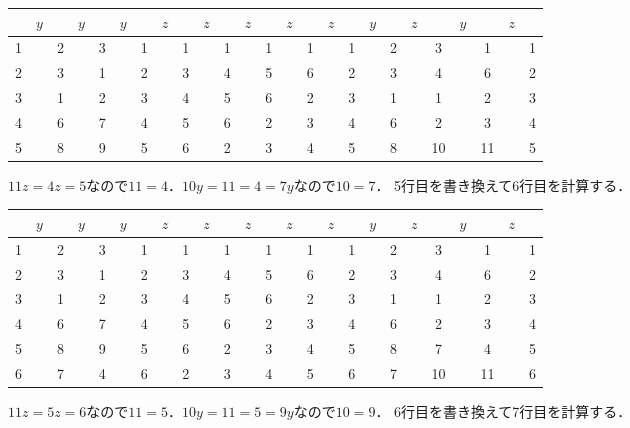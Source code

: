 \documentclass[a4paper]{ltjsreport}
\begin{document}
\begin{center}
  \begin{tabular}{c|cccccc|cccccccccc|cccccccc}
    & $y$ && $y$ && $y$ && $z$ && $z$ && $z$ && $z$ && $z$ && $y$ && $z$ && $y$ && $z$ & \\ \hline
    1 && 2 && 3 && 1 && 1 && 1 && 1 && 1 && 1 && 2 && 3 && 1 && 1 \\
    2 && 3 && 1 && 2 && 3 && 4 && 5 && 6 && 2 && 3 && 4 && 6 && 2 \\
    3 && 1 && 2 && 3 && 4 && 5 && 6 && 2 && 3 && 1 && 1 && 2 && 3 \\
    4 && 6 && 7 && 4 && 5 && 6 && 2 && 3 && 4 && 6 && 2 && 3 && 4 \\
    5 && 8 && 9 && 5 && 6 && 2 && 3 && 4 && 5 && 8 && 10 && 11 && 5
  \end{tabular}
\end{center}
$11z = 4z = 5$なので$11 = 4$．$10y = 11 = 4 = 7y$なので$10 = 7$．
5行目を書き換えて6行目を計算する．

\begin{center}
  \begin{tabular}{c|cccccc|cccccccccc|cccccccc}
    & $y$ && $y$ && $y$ && $z$ && $z$ && $z$ && $z$ && $z$ && $y$ && $z$ && $y$ && $z$ & \\ \hline
    1 && 2 && 3 && 1 && 1 && 1 && 1 && 1 && 1 && 2 && 3 && 1 && 1 \\
    2 && 3 && 1 && 2 && 3 && 4 && 5 && 6 && 2 && 3 && 4 && 6 && 2 \\
    3 && 1 && 2 && 3 && 4 && 5 && 6 && 2 && 3 && 1 && 1 && 2 && 3 \\
    4 && 6 && 7 && 4 && 5 && 6 && 2 && 3 && 4 && 6 && 2 && 3 && 4 \\
    5 && 8 && 9 && 5 && 6 && 2 && 3 && 4 && 5 && 8 && 7 && 4 && 5 \\
    6 && 7 && 4 && 6 && 2 && 3 && 4 && 5 && 6 && 7 && 10 && 11 && 6
  \end{tabular}
\end{center}
$11z = 5z = 6$なので$11 = 5$．$10y = 11 = 5 = 9y$なので$10 = 9$．
6行目を書き換えて7行目を計算する．
\end{document}
